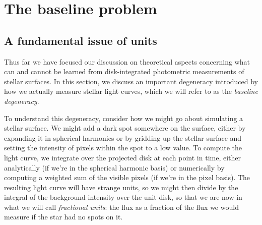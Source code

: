 \documentclass[modern]{aastex62}
\begin{document}
\section{The baseline problem}
\label{sec:baseline}

\subsection{A fundamental issue of units}

Thus far we have focused our discussion on theoretical aspects concerning
what can and cannot be learned from disk-integrated photometric measurements
of stellar surfaces. In this section, we discuss an important degeneracy
introduced by how we actually measure stellar light curves, which we
will refer to as the \emph{baseline degeneracy}.

To understand this degeneracy, consider how we might go about simulating
a stellar surface.
%
We might add a dark spot somewhere on the surface, either by expanding
it in spherical harmonics or by gridding up the stellar surface and
setting the intensity of pixels within the spot to a low value. To compute
the light curve, we integrate over the
projected disk at each point in time, either analytically (if we're
in the spherical harmonic basis) or numerically by computing a weighted
sum of the visible pixels (if we're in the pixel basis). The resulting
light curve will have strange units, so we might then divide by the
integral of the background intensity over the unit disk, so that we are
now in what we will call \emph{fractional units}: the flux as a
fraction of the flux we would measure if the star had no spots on it.
\end{document}
